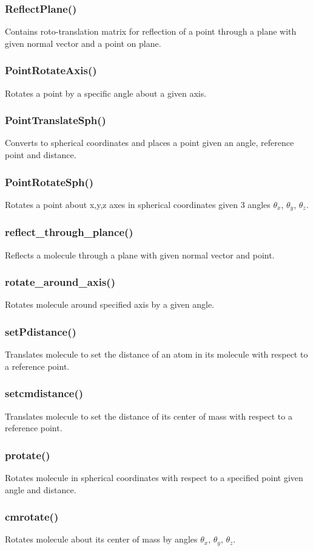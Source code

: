 \documentclass[a4paper,12pt]{assignment}
\begin{document}
\subsubsection{ReflectPlane()}
Contains roto-translation matrix for reflection of a point through a plane with given normal vector and a point on plane.
\subsubsection{PointRotateAxis()} 
Rotates a point by a specific angle about a given axis.
\subsubsection{PointTranslateSph()}
Converts to spherical coordinates and places a point given an angle, reference point and distance.
\subsubsection{PointRotateSph()} 
Rotates a point about x,y,z axes in spherical coordinates given 3 angles $\theta_x$, $\theta_y$, $\theta_z$. 
\subsubsection{reflect_through_plance()} 
Reflects a molecule through a plane with given normal vector and point.
\subsubsection{rotate_around_axis()} 
Rotates molecule around specified axis by a given angle.
\subsubsection{setPdistance()} 
Translates molecule to set the distance of an atom in its molecule with respect to a reference point.
\subsubsection{setcmdistance()} 
Translates molecule to set the distance of its center of mass with respect to a reference point.
\subsubsection{protate()} 
Rotates molecule in spherical coordinates with respect to a specified point given angle and distance.
\subsubsection{cmrotate()}
Rotates molecule about its center of mass by angles $\theta_x$, $\theta_y$, $\theta_z$.
\end{document}
